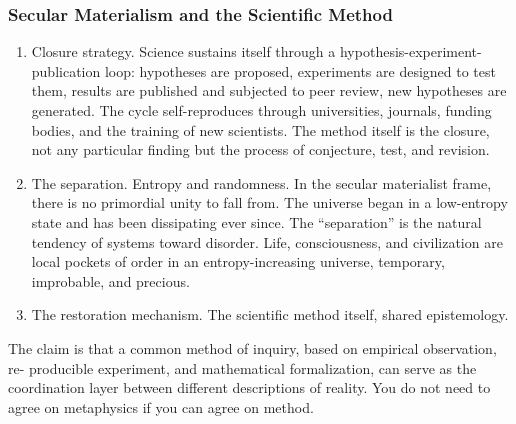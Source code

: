 \documentclass[
]{article}
\providecommand{\tightlist}{%
  \setlength{\itemsep}{0pt}\setlength{\parskip}{0pt}}
\begin{document}
\subsubsection{Secular Materialism and the Scientific
Method}\label{secular-materialism-and-the-scientific-method}

\begin{enumerate}
\def\labelenumi{\arabic{enumi}.}
\setcounter{enumi}{76}
\tightlist
\item
  Closure strategy. Science sustains itself through a
  hypothesis-experiment-publication loop: hypotheses are proposed,
  experiments are designed to test them, results are published and
  subjected to peer review, new hypotheses are generated. The cycle
  self-reproduces through universities, journals, funding bodies, and
  the training of new scientists. The method itself is the closure, not
  any particular finding but the process of conjecture, test, and
  revision.
\item
  The separation. Entropy and randomness. In the secular materialist
  frame, there is no primordial unity to fall from. The universe began
  in a low-entropy state and has been dissipating ever since. The
  ``separation'' is the natural tendency of systems toward disorder.
  Life, consciousness, and civilization are local pockets of order in an
  entropy-increasing universe, temporary, improbable, and precious.
\item
  The restoration mechanism. The scientific method itself, shared
  epistemology.
\end{enumerate}

The claim is that a common method of inquiry, based on empirical
observation, re- producible experiment, and mathematical formalization,
can serve as the coordination layer between different descriptions of
reality. You do not need to agree on metaphysics if you can agree on
method.
\end{document}
